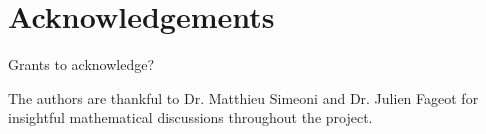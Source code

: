 
\section*{Acknowledgements}

Grants to acknowledge? 

The authors are thankful to Dr. Matthieu Simeoni and Dr. Julien Fageot for insightful mathematical discussions throughout the project.



